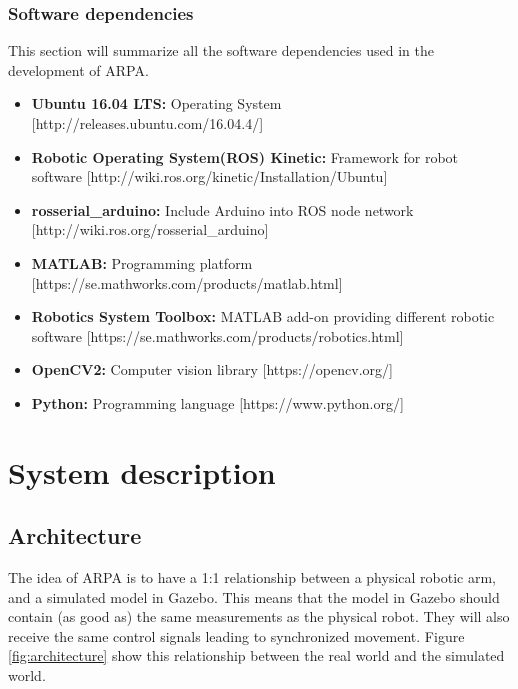 \documentclass[11pt,a4paper, titlepage]{article}
\begin{document}
\subsubsection{Software dependencies}
This section will summarize all the software dependencies used in the development of ARPA.
	\begin{itemize}
		\item \textbf{Ubuntu 16.04 LTS:} Operating System [http://releases.ubuntu.com/16.04.4/]
		\item \textbf{Robotic Operating System(ROS) Kinetic:} Framework for robot software [http://wiki.ros.org/kinetic/Installation/Ubuntu]
		\item \textbf{rosserial\_arduino:} Include Arduino into ROS node network [http://wiki.ros.org/rosserial\_arduino]
		\item \textbf{MATLAB:} Programming platform [https://se.mathworks.com/products/matlab.html]
		\item \textbf{Robotics System Toolbox:} MATLAB add-on providing different robotic software [https://se.mathworks.com/products/robotics.html]
		\item \textbf{OpenCV2:} Computer vision library [https://opencv.org/]
		\item \textbf{Python:} Programming language [https://www.python.org/]
	\end{itemize}
	
\section{System description}
	

\subsection{Architecture}
The idea of ARPA is to have a 1:1 relationship between a physical robotic arm, and a simulated model in Gazebo. This means that the model in Gazebo should contain (as good as) the same measurements as the physical robot. They will also receive the same control signals leading to synchronized movement. Figure \ref{fig:architecture} show this relationship between the real world and the simulated world.
	
\end{document}
